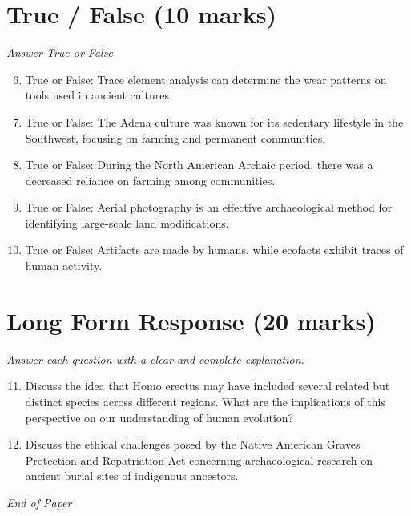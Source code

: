 \documentclass[12pt]{article}
\begin{document}
\section*{True / False (10 marks)}
\textit{Answer True or False}
\begin{enumerate}[label=\arabic*.]
\setcounter{enumi}{5}
\item True or False: Trace element analysis can determine the wear patterns on tools used in ancient cultures.
\item True or False: The Adena culture was known for its sedentary lifestyle in the Southwest, focusing on farming and permanent communities.
\item True or False: During the North American Archaic period, there was a decreased reliance on farming among communities.
\item True or False: Aerial photography is an effective archaeological method for identifying large-scale land modifications.
\item True or False: Artifacts are made by humans, while ecofacts exhibit traces of human activity.
\end{enumerate}

\section*{Long Form Response (20 marks)}
\textit{Answer each question with a clear and complete explanation.}
\begin{enumerate}[label=\arabic*.]
\setcounter{enumi}{10}
\item Discuss the idea that Homo erectus may have included several related but distinct species across different regions. What are the implications of this perspective on our understanding of human evolution?
\item Discuss the ethical challenges posed by the Native American Graves Protection and Repatriation Act concerning archaeological research on ancient burial sites of indigenous ancestors.
\end{enumerate}

\vfill
\noindent\textit{End of Paper}
\end{document}
